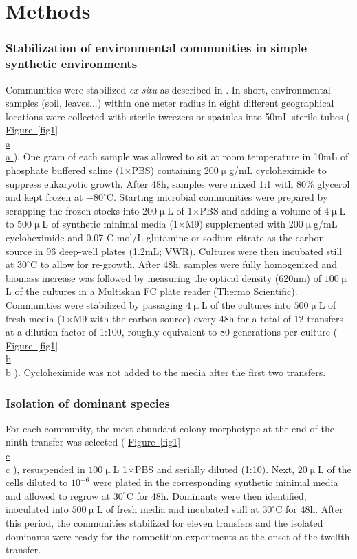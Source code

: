 \documentclass[a4paper,10pt]{article}
\newcommand{\figref}[2][]{%
  \hyperref[{#2}]{%
    Figure~\ref*{#2}%
    \ifx\\#1\\%
    \else
      #1%
    \fi
  }%
}
\begin{document}
\clearpage

\section*{Methods}\label{methods}

\subsubsection*{Stabilization of environmental communities in simple synthetic environments}
\label{methods:community-assembly}

Communities were stabilized \textit{ex situ} as described in \cite{Goldford2018}.
In short, environmental samples (soil, leaves...) within one meter radius in eight different
geographical locations were collected with sterile
tweezers or spatulas into 50mL sterile tubes (\figref[a]{fig1}).
One gram of each sample was allowed to
sit at room temperature in 10mL of phosphate buffered saline (1$\times$PBS) containing
200$\upmu$g/mL cycloheximide to suppress eukaryotic growth.
After 48h, samples were mixed 1:1 with 80\% glycerol and kept frozen at $-80^\circ$C.
Starting microbial communities were prepared by scrapping the frozen stocks into
$200\upmu$L of 1$\times$PBS and adding a volume of $4\upmu$L to $500\upmu$L
of synthetic minimal media (1$\times$M9) supplemented with $200\upmu$g/mL cycloheximide
and 0.07 C-mol/L glutamine or sodium citrate as the carbon source in 96 deep-well plates
(1.2mL; VWR).
Cultures were then incubated still at $30^\circ$C to allow for re-growth.
After 48h, samples were fully homogenized and biomass increase was followed by measuring
the optical density (620nm) of $100\upmu$L of the cultures in a Multiskan FC plate reader
(Thermo Scientific).
Communities were stabilized \cite{Goldford2018} by passaging $4\upmu$L of the cultures into
$500\upmu$L of fresh media (1$\times$M9 with the carbon source)  every 48h for a total of
12 transfers at a dilution factor of 1:100,
roughly equivalent to 80 generations per culture (\figref[b]{fig1}).
Cycloheximide was not added to the media after the first two transfers.

\subsubsection*{Isolation of dominant species}\label{methods:dominants}

For each community, the most abundant colony morphotype at the end of the ninth transfer
was selected (\figref[c]{fig1}),
resuspended in $100\upmu$L 1$\times$PBS and serially diluted (1:10).
Next, $20\upmu$L of the cells diluted to $10^{-6}$ were plated in the corresponding synthetic
minimal media and allowed to regrow at $30^\circ$C for 48h. Dominants were then identified,
inoculated into $500\upmu$L of fresh media and incubated still at $30^\circ$C for 48h.
After this period, the communities stabilized for eleven transfers and the isolated dominants
were ready for the competition experiments at the onset of the twelfth transfer.
\end{document}
